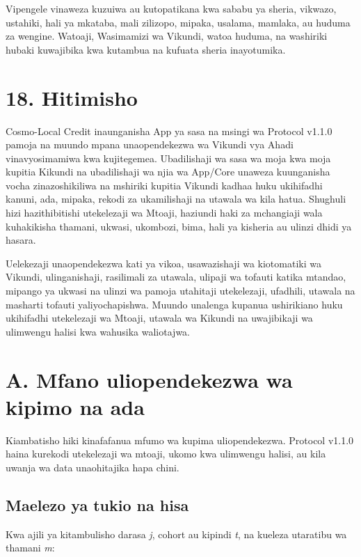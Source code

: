 \documentclass[11pt]{article}
\begin{document}
Vipengele vinaweza kuzuiwa au kutopatikana kwa sababu ya sheria, vikwazo, ustahiki, hali ya mkataba, mali zilizopo, mipaka, usalama, mamlaka, au huduma za wengine. Watoaji, Wasimamizi wa Vikundi, watoa huduma, na washiriki hubaki kuwajibika kwa kutambua na kufuata sheria inayotumika.


\section*{18. Hitimisho}

Cosmo-Local Credit inaunganisha App ya sasa na msingi wa Protocol v1.1.0 pamoja na muundo mpana unaopendekezwa wa Vikundi vya Ahadi vinavyosimamiwa kwa kujitegemea. Ubadilishaji wa sasa wa moja kwa moja kupitia Kikundi na ubadilishaji wa njia wa App/Core unaweza kuunganisha vocha zinazoshikiliwa na mshiriki kupitia Vikundi kadhaa huku ukihifadhi kanuni, ada, mipaka, rekodi za ukamilishaji na utawala wa kila hatua. Shughuli hizi hazithibitishi utekelezaji wa Mtoaji, haziundi haki za mchangiaji wala kuhakikisha thamani, ukwasi, ukombozi, bima, hali ya kisheria au ulinzi dhidi ya hasara.

Uelekezaji unaopendekezwa kati ya vikoa, usawazishaji wa kiotomatiki wa Vikundi, ulinganishaji, rasilimali za utawala, ulipaji wa tofauti katika mtandao, mipango ya ukwasi na ulinzi wa pamoja utahitaji utekelezaji, ufadhili, utawala na masharti tofauti yaliyochapishwa. Muundo unalenga kupanua ushirikiano huku ukihifadhi utekelezaji wa Mtoaji, utawala wa Kikundi na uwajibikaji wa ulimwengu halisi kwa wahusika waliotajwa.


\section*{A. Mfano uliopendekezwa wa kipimo na ada}

Kiambatisho hiki kinafafanua mfumo wa kupima uliopendekezwa. Protocol v1.1.0 haina kurekodi utekelezaji wa mtoaji, ukomo kwa ulimwengu halisi, au kila uwanja wa data unaohitajika hapa chini.

\subsection*{Maelezo ya tukio na hisa}

Kwa ajili ya kitambulisho darasa \emph{j}, cohort au kipindi \emph{t}, na kueleza utaratibu wa thamani \emph{m}:
\end{document}
